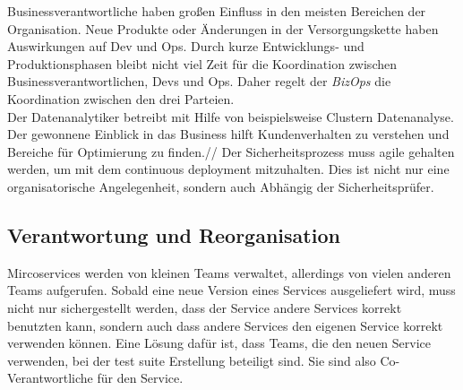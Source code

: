 Businessverantwortliche haben großen Einfluss in den meisten Bereichen der Organisation. Neue Produkte oder Änderungen in der Versorgungskette haben Auswirkungen auf Dev und Ops. Durch kurze Entwicklungs- und Produktionsphasen bleibt nicht viel Zeit für die Koordination zwischen Businessverantwortlichen, Devs und Ops. Daher regelt der \textit{BizOps} die Koordination zwischen den drei Parteien.\\
Der Datenanalytiker betreibt mit Hilfe von beispielsweise Clustern Datenanalyse. Der gewonnene Einblick in das Business hilft Kundenverhalten zu verstehen und Bereiche für Optimierung zu finden.//
Der Sicherheitsprozess muss agile gehalten werden, um mit dem continuous deployment mitzuhalten. Dies ist nicht nur eine organisatorische Angelegenheit, sondern auch Abhängig der Sicherheitsprüfer.

\subsection{Verantwortung und Reorganisation}

Mircoservices werden von kleinen Teams verwaltet, allerdings von vielen anderen Teams aufgerufen. Sobald eine neue Version eines Services ausgeliefert wird, muss nicht nur sichergestellt werden, dass der Service andere Services korrekt benutzten kann, sondern auch dass andere Services den eigenen Service korrekt verwenden können. Eine Lösung dafür ist, dass Teams, die den neuen Service verwenden, bei der test suite Erstellung beteiligt sind. Sie sind also Co-Verantwortliche für den Service. 

